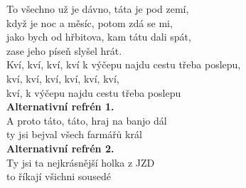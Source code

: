 \begin{multicols}{2}
\singlespacing
To všechno už je dávno, táta je pod zemí,\\
když je noc a měsíc, potom zdá se mi,\\
jako bych od hřbitova, kam tátu dali spát,\\
zase jeho píseň slyšel hrát.\\

Kví, kví, kví, kví k výčepu najdu cestu třeba poslepu, \\
kví, kví, kví, kví, kví, kví, \\
kví, k výčepu najdu cestu třeba poslepu\\

\textbf{Alternativní refrén 1.}\\
A proto táto, táto, hraj na banjo dál\\
ty jsi bejval všech farmářů král\\

\textbf{Alternativní refrén 2.}\\
Ty jsi ta nejkrásnější holka z JZD\\
to říkají všichni sousedé\\
\end{multicols}